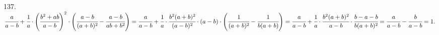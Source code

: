 137. $\cfrac{a}{a-b}+\cfrac{1}{a}\cdot\left(\cfrac{b^2+ab}{a-b}\right)^2\cdot\left(\cfrac{a-b}{(a+b)^2}-\cfrac{a-b}{ab+b^2}\right)=
\cfrac{a}{a-b}+\cfrac{1}{a}\cdot\cfrac{b^2(a+b)^2}{(a-b)^2}\cdot(a-b)\cdot\left(\cfrac{1}{(a+b)^2}-\cfrac{1}{b(a+b)}\right)=
\cfrac{a}{a-b}+\cfrac{1}{a}\cdot\cfrac{b^2(a+b)^2}{a-b}\cdot\cfrac{b-a-b}{b(a+b)^2}=
\cfrac{a}{a-b}-\cfrac{b}{a-b}=1.$\\
